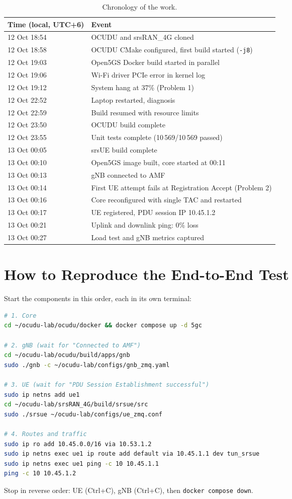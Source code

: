 \documentclass[11pt,a4paper]{article}
\begin{document}
\begin{table}[H]
\centering
\begin{tabular}{l l}
\toprule
Time (local, UTC+6) & Event \\
\midrule
12 Oct 18:54 & OCUDU and srsRAN\_4G cloned \\
12 Oct 18:58 & OCUDU CMake configured, first build started (\texttt{-j8}) \\
12 Oct 19:03 & Open5GS Docker build started in parallel \\
12 Oct 19:06 & Wi-Fi driver PCIe error in kernel log \\
12 Oct 19:12 & System hang at 37\% (Problem 1) \\
12 Oct 22:52 & Laptop restarted, diagnosis \\
12 Oct 22:59 & Build resumed with resource limits \\
12 Oct 23:50 & OCUDU build complete \\
12 Oct 23:55 & Unit tests complete (10\,569/10\,569 passed) \\
13 Oct 00:05 & srsUE build complete \\
13 Oct 00:10 & Open5GS image built, core started at 00:11 \\
13 Oct 00:13 & gNB connected to AMF \\
13 Oct 00:14 & First UE attempt fails at Registration Accept (Problem 2) \\
13 Oct 00:16 & Core reconfigured with single TAC and restarted \\
13 Oct 00:17 & UE registered, PDU session IP 10.45.1.2 \\
13 Oct 00:21 & Uplink and downlink ping: 0\% loss \\
13 Oct 00:27 & Load test and gNB metrics captured \\
\bottomrule
\end{tabular}
\caption{Chronology of the work.}
\end{table}

\section{How to Reproduce the End-to-End Test}

Start the components in this order, each in its own terminal:
\begin{lstlisting}[language=bash]
# 1. Core
cd ~/ocudu-lab/ocudu/docker && docker compose up -d 5gc

# 2. gNB (wait for "Connected to AMF")
cd ~/ocudu-lab/ocudu/build/apps/gnb
sudo ./gnb -c ~/ocudu-lab/configs/gnb_zmq.yaml

# 3. UE (wait for "PDU Session Establishment successful")
sudo ip netns add ue1
cd ~/ocudu-lab/srsRAN_4G/build/srsue/src
sudo ./srsue ~/ocudu-lab/configs/ue_zmq.conf

# 4. Routes and traffic
sudo ip ro add 10.45.0.0/16 via 10.53.1.2
sudo ip netns exec ue1 ip route add default via 10.45.1.1 dev tun_srsue
sudo ip netns exec ue1 ping -c 10 10.45.1.1
ping -c 10 10.45.1.2
\end{lstlisting}
Stop in reverse order: UE (Ctrl+C), gNB (Ctrl+C), then
\texttt{docker compose down}.
\end{document}
